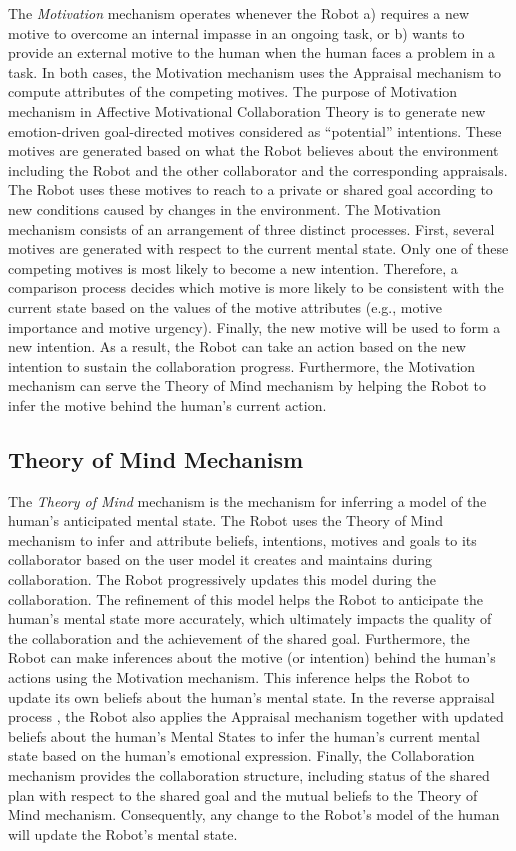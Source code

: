 The \textit{Motivation} mechanism operates whenever the Robot a) requires a new
motive to overcome an internal impasse in an ongoing task, or b) wants to
provide an external motive to the human when the human faces a problem in a
task. In both cases, the Motivation mechanism uses the Appraisal mechanism to
compute attributes of the competing motives. The purpose of Motivation mechanism
in Affective Motivational Collaboration Theory is to generate new emotion-driven
goal-directed motives considered as ``potential'' intentions. These motives are
generated based on what the Robot believes about the environment including the
Robot and the other collaborator and the corresponding appraisals. The Robot
uses these motives to reach to a private or shared goal according to new
conditions caused by changes in the environment. The Motivation mechanism
consists of an arrangement of three distinct processes. First, several motives
are generated with respect to the current mental state. Only one of these
competing motives is most likely to become a new intention. Therefore, a
comparison process decides which motive is more likely to be consistent with the
current state based on the values of the motive attributes (e.g., motive
importance and motive urgency). Finally, the new motive will be used to form a
new intention. As a result, the Robot can take an action based on the new
intention to sustain the collaboration progress. Furthermore, the Motivation
mechanism can serve the Theory of Mind mechanism by helping the Robot to infer
the motive behind the human's current action.

\subsection{Theory of Mind Mechanism}
\label{sec:tom-mech}

The \textit{Theory of Mind} mechanism is the mechanism for inferring a model of
the human's anticipated mental state. The Robot uses the Theory of Mind
mechanism to infer and attribute beliefs, intentions, motives and goals to its
collaborator based on the user model it creates and maintains during
collaboration. The Robot progressively updates this model during the
collaboration. The refinement of this model helps the Robot to anticipate the
human's mental state more accurately, which ultimately impacts the quality of
the collaboration and the achievement of the shared goal. Furthermore, the Robot
can make inferences about the motive (or intention) behind the human's actions
using the Motivation mechanism. This inference helps the Robot to update its own
beliefs about the human's mental state. In the reverse appraisal process
\cite{gratch:reverse-appraisal}, the Robot also applies the Appraisal mechanism
together with updated beliefs about the human's Mental States to infer the
human's current mental state based on the human's emotional expression. Finally,
the Collaboration mechanism provides the collaboration structure, including
status of the shared plan with respect to the shared goal and the mutual beliefs
to the Theory of Mind mechanism. Consequently, any change to the Robot's model
of the human will update the Robot's mental state.

